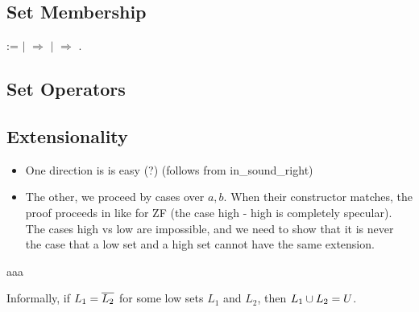 
\subsection{Set Membership}

\begin{coqdoccode}
  \coqdocnoindent
{}    :=   \coqdoceol
\coqdocindent{1.00em}
\ensuremath{|}  \coqdocvar{\_}  \ensuremath{\Rightarrow}    \coqdoceol
\coqdocindent{1.00em}
\ensuremath{|}  \coqdocvar{\_}  \ensuremath{\Rightarrow}    \coqdoceol
\coqdocnoindent
{}.\coqdoceol
\end{coqdoccode}


\subsection{Set Operators}


\subsection{Extensionality}

\begin{itemize}
  \item One direction is is easy (?) (follows from in\_sound\_right)
  \item The other, we proceed by cases over $a, b$. When their constructor matches, the proof proceeds in like for ZF (the case high - high is completely specular). The cases high vs low are impossible, and we need to show that it is never the case that a low set and a high set cannot have the same extension.
\end{itemize}
aaa

Informally, if $L_1 = \overline{L_2}$ for some low sets $L_1$ and $L_2$, then $L_1 \cup L_2 = U$.

